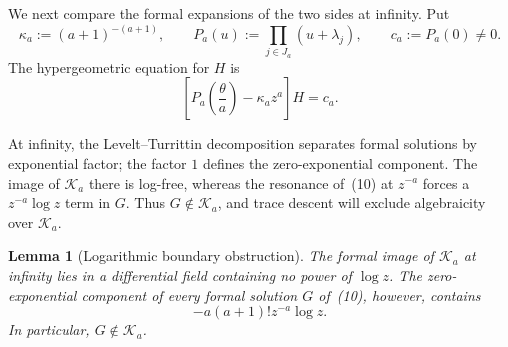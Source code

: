\documentclass[12pt]{article}
\newtheorem{lemma}[theorem]{Lemma}
\begin{document}
We next compare the formal expansions of the two sides at infinity. Put
\[
\kappa_a:=(a+1)^{-(a+1)},
\qquad
P_a(u):=\prod_{j\in J_a}(u+\lambda_j),
\qquad
c_a:=P_a(0)\neq0.
\]
The hypergeometric equation for $H$ is
\[
\left[P_a\!\left(\frac{\theta}{a}\right)-\kappa_a z^a\right]H=c_a.
\tag{11}
\]

At infinity, the Levelt--Turrittin decomposition separates formal solutions by exponential factor; the factor $1$ defines the zero-exponential component. The image of $\mathcal K_a$ there is log-free, whereas the resonance of~(10) at $z^{-a}$ forces a $z^{-a}\log z$ term in $G$. Thus $G\notin\mathcal K_a$, and trace descent will exclude algebraicity over $\mathcal K_a$.

\begin{lemma}[Logarithmic boundary obstruction]
\label{lem:field-log-obstruction}
The formal image of $\mathcal K_a$ at infinity lies in a differential field containing no power of $\log z$. The zero-exponential component of every formal solution $G$ of~(10), however, contains
\[
-a(a+1)!z^{-a}\log z.
\tag{12}
\]
In particular, $G\notin\mathcal K_a$.
\end{lemma}
\end{document}

